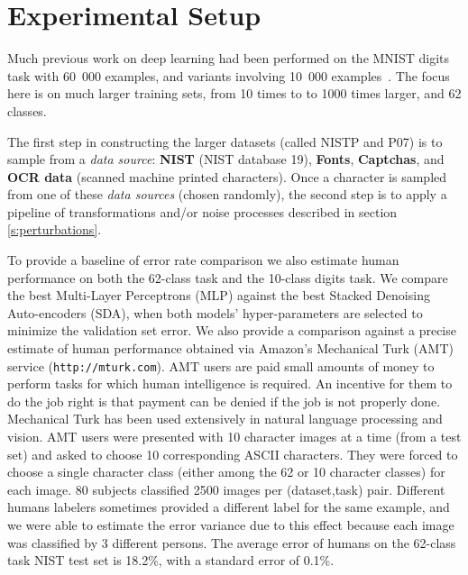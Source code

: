 \documentclass{article} %
\begin{document}
\vspace*{-3mm}
\section{Experimental Setup}
\vspace*{-1mm}

Much previous work on deep learning had been performed on
the MNIST digits task
with 60~000 examples, and variants involving 10~000
examples~\citep{VincentPLarochelleH2008-very-small}.
The focus here is on much larger training sets, from 10 times to 
to 1000 times larger, and 62 classes.

The first step in constructing the larger datasets (called NISTP and P07) is to sample from
a {\em data source}: {\bf NIST} (NIST database 19), {\bf Fonts}, {\bf Captchas},
and {\bf OCR data} (scanned machine printed characters). Once a character
is sampled from one of these {\em data sources} (chosen randomly), the second step is to
apply a pipeline of transformations and/or noise processes described in section \ref{s:perturbations}.

To provide a baseline of error rate comparison we also estimate human performance
on both the 62-class task and the 10-class digits task.
We compare the best Multi-Layer Perceptrons (MLP) against
the best Stacked Denoising Auto-encoders (SDA), when
both models' hyper-parameters are selected to minimize the validation set error.
We also provide a comparison against a precise estimate
of human performance obtained via Amazon's Mechanical Turk (AMT)
service ({\tt http://mturk.com}). 
AMT users are paid small amounts
of money to perform tasks for which human intelligence is required.
An incentive for them to do the job right is that payment can be denied
if the job is not properly done.
Mechanical Turk has been used extensively in natural language processing and vision.
AMT users were presented
with 10 character images at a time (from a test set) and asked to choose 10 corresponding ASCII
characters. They were forced to choose a single character class (either among the
62 or 10 character classes) for each image.
80 subjects classified 2500 images per (dataset,task) pair.
Different humans labelers sometimes provided a different label for the same
example, and we were able to estimate the error variance due to this effect
because each image was classified by 3 different persons. 
The average error of humans on the 62-class task NIST test set
is 18.2\%, with a standard error of 0.1\%.
\end{document}
